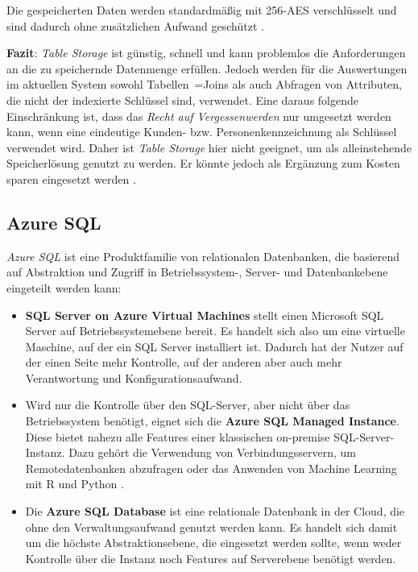 Die gespeicherten Daten werden standardmäßig mit 256-AES verschlüsselt und sind dadurch ohne zusätzlichen Aufwand geschützt \cite{soh_microsoft_2020}.

\textbf{Fazit}: \textit{Table Storage} ist günstig, schnell und kann problemlos die Anforderungen an die zu speichernde Datenmenge erfüllen. Jedoch werden für die Auswertungen im aktuellen System sowohl Tabellen~=Joins als auch Abfragen von Attributen, die nicht der indexierte Schlüssel sind, verwendet. Eine daraus folgende Einschränkung ist, dass das \textit{Recht auf Vergessenwerden} nur umgesetzt werden kann, wenn eine eindeutige Kunden- bzw. Personenkennzeichnung als Schlüssel verwendet wird. Daher ist \textit{Table Storage} hier nicht geeignet, um als alleinstehende Speicherlösung genutzt zu werden. Er könnte jedoch als Ergänzung zum Kosten sparen eingesetzt werden \cite[vgl.][]{reagan_web_2018}. 


\subsection{Azure SQL} \label{sec:grundlagen:azure_dienste:sql}
\textit{Azure SQL} ist eine Produktfamilie von relationalen Datenbanken, die basierend auf Abstraktion und Zugriff in Betriebssystem-, Server- und Datenbankebene eingeteilt werden kann\cite{mauri_azure_2021}:

\begin{itemize}
\item \textbf{SQL Server on Azure Virtual Machines} stellt einen Microsoft SQL Server auf Betriebssystemebene bereit. Es handelt sich also um eine virtuelle Maschine, auf der ein SQL Server installiert ist. Dadurch hat der Nutzer auf der einen Seite mehr Kontrolle, auf der anderen aber auch mehr Verantwortung und Konfigurationsaufwand. 
\item Wird nur die Kontrolle über den SQL-Server, aber nicht über das Betriebssystem benötigt, eignet sich die \textbf{Azure SQL Managed Instance}. Diese bietet nahezu alle Features einer klassischen on-premise SQL-Server-Instanz. Dazu gehört die Verwendung von Verbindungsservern, um Remotedatenbanken abzufragen \cite{ljepava_t-sql_2021} oder das Anwenden von Machine Learning mit R und Python \cite{ericson_was_2021}.
\item Die \textbf{Azure SQL Database} ist eine relationale Datenbank in der Cloud, die ohne den Verwaltungsaufwand genutzt werden kann. Es handelt sich damit um die höchste Abstraktionsebene, die eingesetzt werden sollte, wenn weder Kontrolle über die Instanz noch Features auf Serverebene benötigt werden.
\end{itemize}

